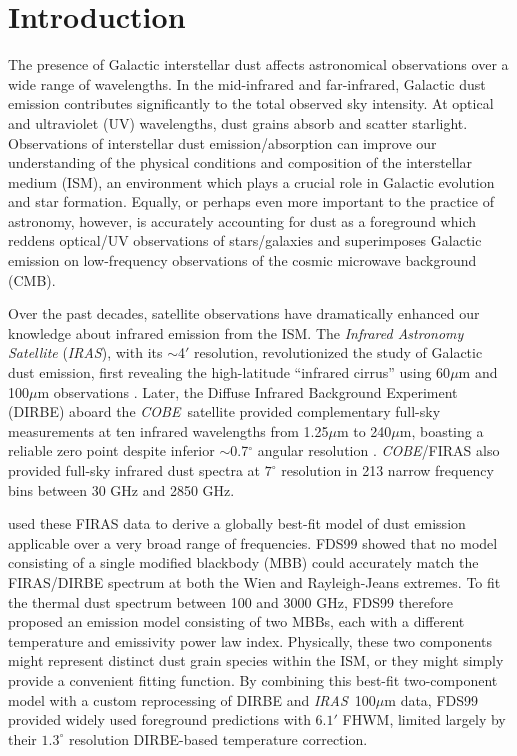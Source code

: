 \documentclass{emulateapj}
\newcommand{\IRAS}{{\it IRAS}}
\newcommand{\COBE}{{\it COBE}}
\begin{document}
\section{Introduction}
The presence of Galactic interstellar dust affects
astronomical observations over a wide range of wavelengths. In the mid-infrared
and far-infrared, Galactic dust emission contributes significantly
to the total observed sky intensity. At optical and ultraviolet (UV) 
wavelengths, dust grains absorb and scatter starlight. Observations of 
interstellar dust emission/absorption can improve our understanding of the 
physical conditions and composition of the interstellar medium (ISM), an 
environment which plays a crucial role in Galactic evolution and star 
formation. Equally, or perhaps even more important to the practice of 
astronomy, however, is accurately accounting for dust as a foreground which 
reddens optical/UV observations of stars/galaxies and superimposes Galactic 
emission on low-frequency observations of the cosmic microwave background 
(CMB).

Over the past decades, satellite observations have dramatically enhanced our
knowledge about infrared emission from the ISM. The \textit{Infrared Astronomy 
Satellite} (\IRAS), with its $\sim$4$'$ resolution, revolutionized the study of
 Galactic dust emission, first revealing the high-latitude ``infrared cirrus'' 
using 60$\mu$m and 100$\mu$m observations \citep{low84, wheelock94}. Later, the
Diffuse Infrared Background Experiment (DIRBE) aboard the \COBE~satellite 
provided complementary full-sky measurements at ten infrared wavelengths from 
1.25$\mu$m to 240$\mu$m, boasting a reliable zero point despite inferior 
$\sim$0.7$^{\circ}$ angular resolution \citep{boggess92}. \COBE/FIRAS 
\citep{firas} also provided full-sky infrared dust spectra at $7^{\circ}$ 
resolution in 213 narrow frequency bins between 30 GHz and 2850 GHz.

\citet[hereafter FDS99]{FDS99} used these FIRAS data to derive a globally 
best-fit model of dust emission applicable over a very broad range of 
frequencies. FDS99 showed that no model consisting of a single modified 
blackbody (MBB) could accurately match the FIRAS/DIRBE spectrum at both the 
Wien and Rayleigh-Jeans extremes. To fit the thermal dust spectrum between 100 
and 3000 GHz, FDS99 therefore proposed an emission model consisting of two 
MBBs, each with a different temperature and emissivity power law index. 
Physically, these two components might represent distinct dust grain species 
within the ISM, or they might simply provide a convenient fitting function. By 
combining this best-fit two-component model with a custom reprocessing of 
DIRBE and \IRAS~100$\mu$m data, FDS99 provided widely used foreground 
predictions with $6.1'$ FHWM, limited largely by their $1.3^{\circ}$ resolution
DIRBE-based temperature correction.
\end{document}
